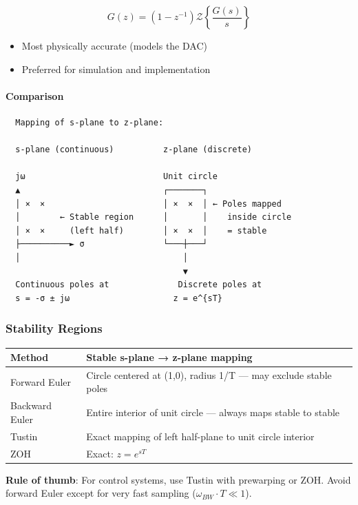 \documentclass[11pt,a4paper]{book}
\begin{document}
\[G(z) = (1 - z^{-1}) \mathcal{Z}\left\{\frac{G(s)}{s}\right\}\]

\begin{itemize}
\item Most physically accurate (models the DAC)
\item Preferred for simulation and implementation
\end{itemize}

\paragraph{Comparison}

\begin{lstlisting}
  Mapping of s-plane to z-plane:
  
  s-plane (continuous)          z-plane (discrete)
  
  jω                            Unit circle
  ▲                             ┌───────┐
  │ ×  ×                        │ ×  ×  │ ← Poles mapped
  │        ← Stable region      │       │    inside circle
  │ ×  ×     (left half)        │ ×  ×  │    = stable
  ├──────────► σ                └───┼───┘
  │                                 │
                                    ▼
  Continuous poles at              Discrete poles at
  s = -σ ± jω                     z = e^{sT}
\end{lstlisting}

\medskip\noindent\hrulefill\medskip

\subsubsection{Stability Regions}

\begin{center}
\begin{tabular}{|l|l|}
\hline
Method & Stable s-plane → z-plane mapping \\
\hline
Forward Euler & Circle centered at (1,0), radius 1/T — may exclude stable poles \\
Backward Euler & Entire interior of unit circle — always maps stable to stable \\
Tustin & Exact mapping of left half-plane to unit circle interior \\
ZOH & Exact: $z = e^{sT}$ \\
\hline
\end{tabular}
\end{center}

\textbf{Rule of thumb}: For control systems, use Tustin with prewarping or ZOH. Avoid forward Euler except for very fast sampling ($\omega_{BW} \cdot T \ll 1$).
\end{document}

